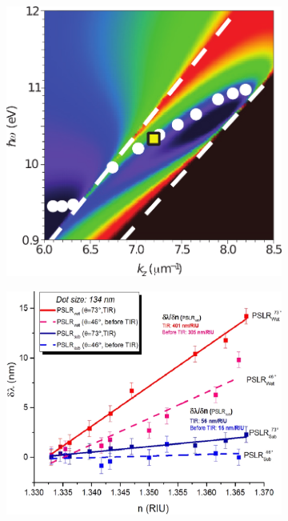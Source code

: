 \begin{figure}[h!]
\begin{subfigure}{.01\linewidth}\caption{ }\label{sfig:k(w)Kobashin} \vspace{5cm}	\end{subfigure} 
		\begin{subfigure}{.45\linewidth}\hspace{1em}\includegraphics[scale=1]{0-4-Introduccion/figs/dispersion.png}\end{subfigure}	
\begin{subfigure}{.01\linewidth}\caption{ }\label{sfig:dLambda}\vspace{4.75cm}\end{subfigure}  
		\begin{subfigure}{.45\linewidth}\hspace*{-.5em}\includegraphics[scale=.9]{0-4-Introduccion/figs/sensibilidad.png}\end{subfigure}		

\end{figure}
